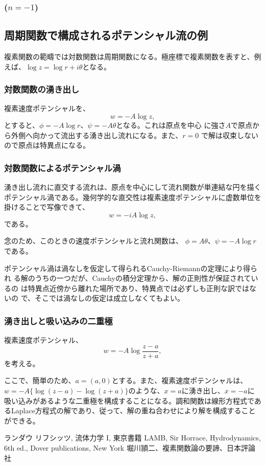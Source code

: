 \subsubsection{($n=-1$)}

\subsection{周期関数で構成されるポテンシャル流の例}
複素関数の範疇では対数関数は周期関数になる。極座標で複素関数を表すと、例
えば、$\log z = \log r + i\theta$となる。
\subsubsection{対数関数の湧き出し}
複素速度ポテンシャルを、
\begin{equation}
 w = -A\log z,
\end{equation}
とすると、$\phi = -A \log r$、$\psi = -A\theta$となる。これは原点を中心
に強さ$A$で原点から外側へ向かって流出する湧き出し流れになる。また、$r=0$
で解は収束しないので原点は特異点になる。

\subsubsection{対数関数によるポテンシャル渦}
湧き出し流れに直交する流れは、原点を中心にして流れ関数が単連結な円を描く
ポテンシャル渦である。幾何学的な直交性は複素速度ポテンシャルに虚数単位を
掛けることで写像できて、
\begin{equation}
 w = -iA\log z,
\end{equation}
である。

念のため、このときの速度ポテンシャルと流れ関数は、
$\phi = A\theta$、$\psi = -A\log r$である。

ポテンシャル渦は渦なしを仮定して得られるCauchy-Riemannの定理により得られ
る解のうちの一つだが、Cauchyの積分定理から、解の正則性が保証されているの
は特異点近傍から離れた場所であり、特異点では必ずしも正則な訳ではないの
で、そこでは渦なしの仮定は成立しなくてもよい。

\subsubsection{湧き出しと吸い込みの二重極}
複素速度ポテンシャル、
\begin{equation}
 w = -A\log \frac{z - a}{z + a},
\end{equation}
を考える。

ここで、簡単のため、$a=(a, 0)$とする。また、複素速度ポテンシャルは、
$w = -A \{\log (z-a) - \log (z+a)\}$のような、$x=a$に湧き出し、$x=-a$に
吸い込みがあるような二重極を構成することになる。調和関数は線形方程式であ
るLaplace方程式の解であり、従って、解の重ね合わせにより解を構成すること
ができる。



\begin{thebibliography}{10}
  ランダウ リフシッツ, 流体力学 I, 東京書籍
  LAMB, Sir Horrace, Hydrodynamics, 6th ed.,
	 Dover publications, New York
  堀川頴二、複素関数論の要諦、日本評論社
\end{thebibliography}